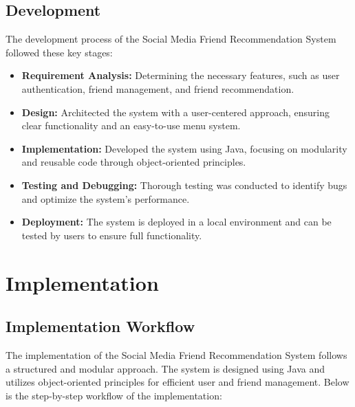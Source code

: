 \documentclass[12pt]{report}
\begin{document}
\subsection{Development}
The development process of the Social Media Friend Recommendation System followed these key stages:

\begin{itemize}
    \item \textbf{Requirement Analysis:} Determining the necessary features, such as user authentication, friend management, and friend recommendation.
    \item \textbf{Design:} Architected the system with a user-centered approach, ensuring clear functionality and an easy-to-use menu system.
    \item \textbf{Implementation:} Developed the system using Java, focusing on modularity and reusable code through object-oriented principles.
    \item \textbf{Testing and Debugging:} Thorough testing was conducted to identify bugs and optimize the system's performance.
    \item \textbf{Deployment:} The system is deployed in a local environment and can be tested by users to ensure full functionality.
\end{itemize}

\section{Implementation}

\subsection{ Implementation Workflow}

The implementation of the Social Media Friend Recommendation System follows a structured and modular approach. The system is designed using Java and utilizes object-oriented principles for efficient user and friend management. Below is the step-by-step workflow of the implementation:
\end{document}
